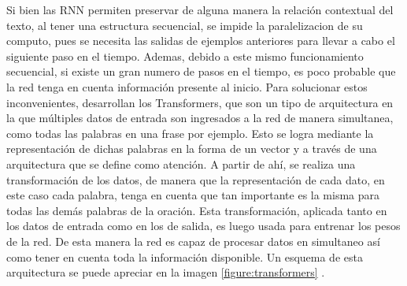 Si bien las RNN permiten preservar de alguna manera la relación contextual del texto, al tener una estructura secuencial, se impide la paralelizacion de su computo, pues se necesita las salidas de ejemplos anteriores para llevar a cabo el siguiente paso en el tiempo. Ademas, debido a este mismo funcionamiento secuencial, si existe un gran numero de pasos en el tiempo, es poco probable que la red tenga en cuenta información presente al inicio. Para solucionar estos inconvenientes, \cite{vaswani2017attention} desarrollan los Transformers, que son un tipo de arquitectura en la que múltiples datos de entrada son ingresados a la red de manera simultanea, como todas las palabras en una frase por ejemplo. Esto se logra mediante la representación de dichas palabras en la forma de un vector y a través de una arquitectura que se define como atención. A partir de ahí, se realiza una transformación de los datos, de manera que la representación de cada dato, en este caso cada palabra, tenga en cuenta que tan importante es la misma para todas las demás palabras de la oración. Esta transformación, aplicada tanto en los datos de entrada como en los de salida, es luego usada para entrenar los pesos de la red. De esta manera la red es capaz de procesar datos en simultaneo así como tener en cuenta toda la información disponible. Un esquema de esta arquitectura se puede apreciar en la imagen \ref{figure:transformers} \cite{vaswani2017attention}.

